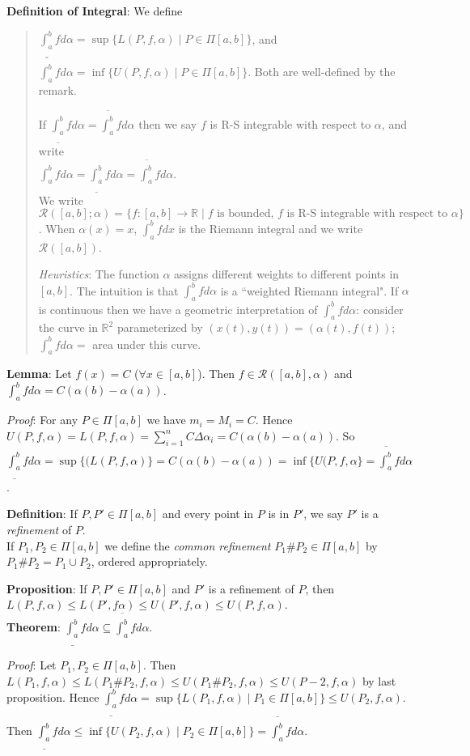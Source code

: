 \documentclass[11pt]{article}
\begin{document}
\textbf{Definition of Integral}: We define
\begin{quote}\vspace{-0.3cm}
$\underline{\int_a^b} f d\alpha = \sup \{L(P, f, \alpha) \;|\; P \in \Pi[a,b]\}$, and $\overline{\int_a^b} f d\alpha = \inf \{U(P, f, \alpha) \;|\; P \in \Pi[a,b]\}$. Both are well-defined by the remark.

If $\underline{\int_a^b} f d\alpha = \overline{\int_a^b} f d\alpha$ then we say $f$ is R-S integrable with respect to $\alpha$, and write\\ $\int_a^b f d\alpha = \underline{\int_a^b} f d\alpha = \overline{\int_a^b} f d\alpha$.\\

We write $\mathcal{R}([a,b]; \alpha) = \{f : [a,b] \to \mathbb{R} \;|\; f \text{ is bounded, } f \text{ is R-S integrable with respect to }\alpha\}$. When $\alpha(x) = x$, $\int_a^b f dx$ is the Riemann integral and we write $\mathcal{R}([a,b])$.

\emph{Heuristics}: The function $\alpha$ assigns different weights to different points in $[a,b]$. The intuition is that $\int_a^b f d\alpha$ is a ``weighted Riemann integral". If $\alpha$ is continuous then we have a geometric interpretation of $\int_a^b f d \alpha$: consider the curve in $\mathbb{R}^2$ parameterized by $(x(t), y(t)) = (\alpha(t), f(t))$; $\int_a^b f d\alpha =$ area under this curve.
\end{quote}

\textbf{Lemma}: Let $f(x) = C$ ($\forall x \in [a,b]$). Then $f \in \mathcal{R}([a,b], \alpha)$ and $\int_a^b f d\alpha = C(\alpha(b) - \alpha(a))$.

\emph{Proof}: For any $P \in \Pi[a,b]$ we have $m_i = M_i = C$. Hence $U(P, f, \alpha) = L(P, f, \alpha) = \sum_{i=1}^n C \Delta \alpha_i = C(\alpha(b) - \alpha(a))$. So $\underline{\int_a^b} f d\alpha = \sup \{(L(P, f, \alpha)\} = C(\alpha(b) - \alpha(a)) = \inf \{U(P, f, \alpha\} = \overline{\int_a^b} f d\alpha$.

\textbf{Definition}: If $P, P' \in \Pi[a,b]$ and every point in $P$ is in $P'$, we say $P'$ is a \emph{refinement} of $P$.\\
If $P_1, P_2 \in \Pi[a,b]$ we define the \emph{common refinement} $P_1 \# P_2 \in \Pi[a,b]$ by $P_1 \# P_2 = P_1 \cup P_2$, ordered appropriately.

\textbf{Proposition}: If $P, P' \in \Pi[a,b]$ and $P'$ is a refinement of $P$, then $L(P, f, \alpha) \leq L(P', f \alpha) \leq U(P', f, \alpha) \leq U(P, f, \alpha)$.\\

\textbf{Theorem}: $\underline{\int_a^b} f d\alpha \subseteq \overline{\int_a^b} f d \alpha$.

\emph{Proof}: Let $P_1, P_2 \in \Pi[a,b]$. Then $L(P_1, f, \alpha) \leq L(P_1 \# P_2, f, \alpha) \leq U(P_1 \# P_2, f, \alpha) \leq U(P-2, f, \alpha)$ by last proposition. Hence $\underline{\int_a^b} f d\alpha = \sup\{L(P_1, f, \alpha) \;|\; P_1 \in \Pi[a,b]\} \leq U(P_2, f, \alpha)$. Then $\underline{\int_a^b} f d\alpha \leq \inf \{U(P_2, f, \alpha) \;|\; P_2 \in \Pi[a,b]\} = \overline{\int_a^b} f d\alpha$.
\end{document}
